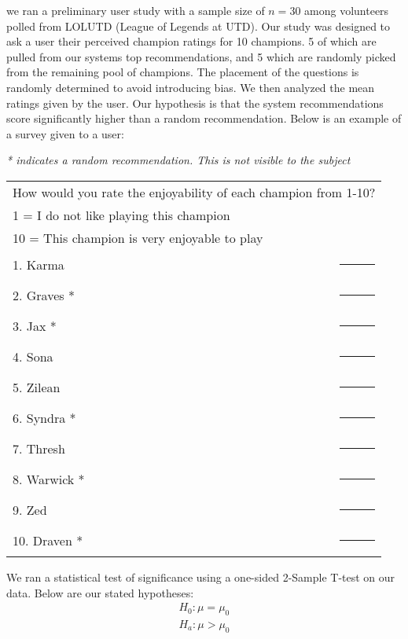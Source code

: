 \documentclass [11pt]{IEEEtran}
\begin{document}
we ran a preliminary user study with a sample size of $n=30$ among volunteers polled from LOLUTD (League of Legends at UTD). Our study was designed to ask a user their perceived champion ratings for 10 champions. 5 of which are pulled from our systems top recommendations, and 5 which are randomly picked from the remaining pool of champions. The placement of the questions is randomly determined to avoid introducing bias. We then analyzed the mean ratings given by the user. Our hypothesis is that the system recommendations score significantly higher than a random recommendation. Below is an example of a survey given to a user:
\newpage
\begin{flushleft} 
\textit{* indicates a random recommendation. This is not visible to the subject}\\
\begingroup
\setlength{\tabcolsep}{10pt}
\renewcommand{\arraystretch}{1.5} 
\begin{tabular}{|l r|}
    \hline
    \multicolumn{2}{|p{.9\linewidth}|}{
    How would you rate the enjoyability of each champion from 1-10?} \\
    \multicolumn{2}{|p{.9\linewidth}|}{1 = I do not like playing this champion} \\
    \multicolumn{2}{|p{.9\linewidth}|}{10 = This champion is very enjoyable to play} \\
     1. Karma & \rule{1cm}{1pt} \\ 
     2. Graves *  & \rule{1cm}{1pt} \\
     3. Jax * & \rule{1cm}{1pt} \\
     4. Sona & \rule{1cm}{1pt} \\
     5. Zilean & \rule{1cm}{1pt} \\
     6. Syndra * & \rule{1cm}{1pt} \\
     7. Thresh & \rule{1cm}{1pt} \\
     8. Warwick * & \rule{1cm}{1pt} \\
     9. Zed & \rule{1cm}{1pt} \\ 
     10. Draven * & \rule{1cm}{1pt} \\
     \hline
\end{tabular}
\endgroup
\end{flushleft}
\noindent We ran a statistical test of significance using a one-sided 2-Sample T-test on our data. Below are our stated hypotheses:  
\begin{align*}
H_0: \mu = \mu_{0} \\
H_a: \mu > \mu_{0} 
\end{align*}
\end{document}
